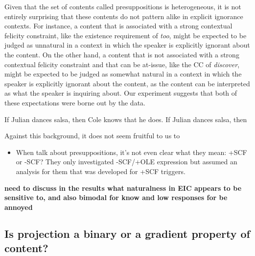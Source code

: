 \documentclass[11pt,fleqn]{article}
\newcommand{\6}{\mbox{$[\hspace*{-.6mm}[$}}
\newcommand{\9}{\mbox{$]\hspace*{-.6mm}]$}}
\begin{document}
Given that the set of contents called presuppositions is heterogeneous, it is not entirely surprising that these contents do not pattern alike in explicit ignorance contexts. For instance, a content that is associated with a strong contextual felicity constraint, like the existence requirement of {\em too}, might be expected to be judged as unnatural in a context in which the speaker is explicitly ignorant about the content. On the other hand, a content that is not associated with a strong contextual felicity constraint and that can be at-issue, like the CC of {\em discover}, might be expected to be judged as somewhat natural in a context in which the speaker is explicitly ignorant about the content, as the content can be interpreted as what the speaker is inquiring about. Our experiment suggests that both of these expectations were borne out by the data. 

\begin{exe}
\ex
\begin{xlist}
\ex If Julian dances salsa, then Cole knows that he does.
\ex If Julian dances salsa, then 
\end{xlist}
\end{exe}

Against this background, it does not seem fruitful to us to 

\begin{itemize}

\item When \citealt{mandelkern-etal2020} talk about presuppositions, it's not even clear what they mean: +SCF or -SCF? They only investigated -SCF/+OLE expression but assumed an analysis for them that was developed for +SCF triggers.

\end{itemize}

{\bf need to discuss in the results what naturalness in EIC appears to be sensitive to, and also bimodal for know and low responses for be annoyed}

\subsection{Is projection a binary or a gradient property of content?}
\end{document}

